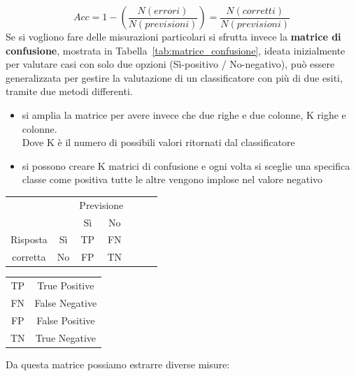 %
\begin{equation}
	Acc = 1 - \left( \frac{N(errori)}{N(previsioni)} \right) = \frac{N(corretti)}{N(previsioni)}
	\label{eq:accuratezza}
\end{equation}
%
Se si vogliono fare delle misurazioni particolari si sfrutta invece la \textbf{matrice di confusione}, mostrata in Tabella~\ref{tab:matrice_confusione}, ideata inizialmente per valutare casi con solo due opzioni (Sì-positivo / No-negativo), può essere generalizzata per gestire la valutazione di un classificatore con più di due esiti, tramite due metodi differenti.
\begin{itemize}
	\item si amplia la matrice per avere invece che due righe e due colonne, K righe e colonne.\\
	Dove K è il numero di possibili valori ritornati dal classificatore
	\item si possono creare K matrici di confusione e ogni volta si sceglie una specifica classe come positiva tutte le altre vengono implose nel valore negativo
\end{itemize}
%
\begin{multicols}{2}
\begin{center}
	\begin{tabular}{cc|c|c| c|r|l|}
		 &  & \multicolumn{2}{|c|}{Previsione}\\
		 &  & Sì & No\\
		 \hline
		 Risposta & Sì & TP & FN\\
		 \hline
		 corretta & No & FP & TN\\
		\hline
	\end{tabular}
	\label{tab:matrice_confusione}
	\begin{tabular}{|c|c|}
		\hline
		TP & True Positive \\
		FN & False Negative \\
		FP & False Positive \\
		TN & True Negative \\
		\hline
	\end{tabular}
	\label{tab:MC_significato}
\end{center}
\end{multicols}
%
Da questa matrice possiamo estrarre diverse misure:
